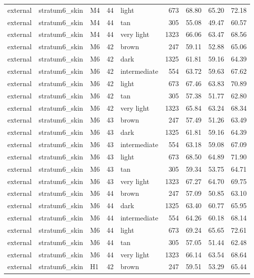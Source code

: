 \begin{tabular}{lllrlrrrr}
external & stratum6\_skin & M4 & 44 & light & 673 & 68.80 & 65.20 & 72.18 \\
external & stratum6\_skin & M4 & 44 & tan & 305 & 55.08 & 49.47 & 60.57 \\
external & stratum6\_skin & M4 & 44 & very light & 1323 & 66.06 & 63.47 & 68.56 \\
external & stratum6\_skin & M6 & 42 & brown & 247 & 59.11 & 52.88 & 65.06 \\
external & stratum6\_skin & M6 & 42 & dark & 1325 & 61.81 & 59.16 & 64.39 \\
external & stratum6\_skin & M6 & 42 & intermediate & 554 & 63.72 & 59.63 & 67.62 \\
external & stratum6\_skin & M6 & 42 & light & 673 & 67.46 & 63.83 & 70.89 \\
external & stratum6\_skin & M6 & 42 & tan & 305 & 57.38 & 51.77 & 62.80 \\
external & stratum6\_skin & M6 & 42 & very light & 1323 & 65.84 & 63.24 & 68.34 \\
external & stratum6\_skin & M6 & 43 & brown & 247 & 57.49 & 51.26 & 63.49 \\
external & stratum6\_skin & M6 & 43 & dark & 1325 & 61.81 & 59.16 & 64.39 \\
external & stratum6\_skin & M6 & 43 & intermediate & 554 & 63.18 & 59.08 & 67.09 \\
external & stratum6\_skin & M6 & 43 & light & 673 & 68.50 & 64.89 & 71.90 \\
external & stratum6\_skin & M6 & 43 & tan & 305 & 59.34 & 53.75 & 64.71 \\
external & stratum6\_skin & M6 & 43 & very light & 1323 & 67.27 & 64.70 & 69.75 \\
external & stratum6\_skin & M6 & 44 & brown & 247 & 57.09 & 50.85 & 63.10 \\
external & stratum6\_skin & M6 & 44 & dark & 1325 & 63.40 & 60.77 & 65.95 \\
external & stratum6\_skin & M6 & 44 & intermediate & 554 & 64.26 & 60.18 & 68.14 \\
external & stratum6\_skin & M6 & 44 & light & 673 & 69.24 & 65.65 & 72.61 \\
external & stratum6\_skin & M6 & 44 & tan & 305 & 57.05 & 51.44 & 62.48 \\
external & stratum6\_skin & M6 & 44 & very light & 1323 & 66.14 & 63.54 & 68.64 \\
external & stratum6\_skin & H1 & 42 & brown & 247 & 59.51 & 53.29 & 65.44 \\

\end{tabular}
